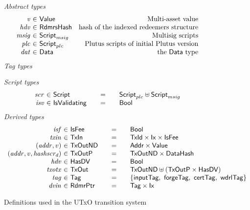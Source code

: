 \begin{figure*}[htb]
  \emph{Abstract types}
  \begin{equation*}
    \begin{array}{r@{~\in~}lr}
      \var{v} &\Value & \text{Multi-asset value}\\
      \var{hdv} &\RdmrsHash & \text{hash of the indexed redeemers structure}\\
      \var{msig} & \ScriptMSig & \text{Multisig scripts} \\
      \var{plc} & \ScriptPlutus & \text{Plutus scripts of initial Plutus version} \\
      \var{dat} & \Data & \text{the $\Data$ type} \\
    \end{array}
  \end{equation*}
  \emph{Tag types}
  \begin{center}
    
  \end{center}
  \emph{Script types}
  \begin{equation*}
    \begin{array}{r@{~\in~}l@{\qquad=\qquad}lr}
      \var{scr} & \Script & \ScriptPlutus \uniondistinct \ScriptMSig \\
      \var{isv} & \IsValidating & \Bool \\
    \end{array}
  \end{equation*}
%
  \emph{Derived types}
  \begin{equation*}
    \begin{array}{r@{~\in~}l@{\qquad=\qquad}lr}
      \var{isf}
      & \IsFee
      & \Bool
      \\
      \var{txin}
      & \TxIn
      & \TxId \times \Ix \times \IsFee
      \\
      (\var{addr}, v)
      & \type{TxOutND}
      & \Addr \times \Value
      \\
      (\var{addr}, v, \var{hashscr_d})
      & \type{TxOutP}
      & \type{TxOutND} \times \DataHash
      \\
      \var{hdv}
      & \HasDV
      & \Bool
      \\
      \var{txotx}
      & \TxOut
      & \TxOutND \uniondistinct (\TxOutP \times \HasDV)
      \\
      \var{tag}
      & \Tag
      & \{\mathsf{inputTag},~\mathsf{forgeTag},~\mathsf{certTag},~\mathsf{wdrlTag}\}
      \\
      \var{dvin}
      & \RdmrPtr
      & \Tag \times \Ix
    \end{array}
  \end{equation*}
  \caption{Definitions used in the UTxO transition system}
  \label{fig:defs:utxo-shelley-1}
\end{figure*}



